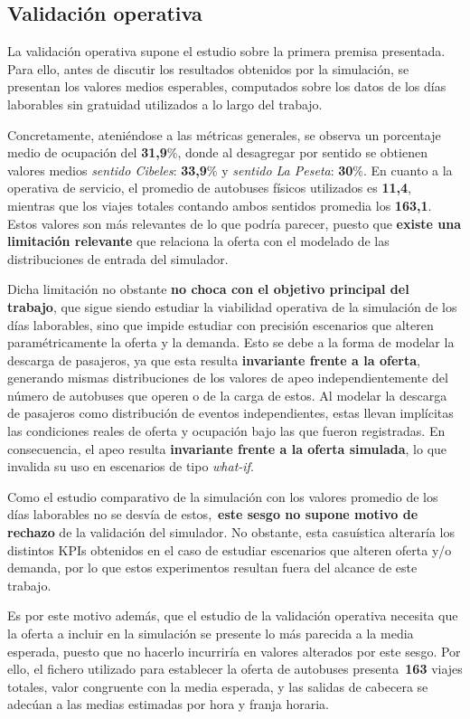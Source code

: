 \subsection{Validación operativa}
La validación operativa supone el estudio sobre la primera premisa presentada. Para ello, antes de discutir los resultados obtenidos
por la simulación, se presentan los valores medios esperables, computados sobre los datos de los días laborables sin gratuidad utilizados
a lo largo del trabajo.

Concretamente, ateniéndose a las métricas generales, se observa un porcentaje medio de ocupación del \textbf{31,9}\%, donde al desagregar
por sentido se obtienen valores medios \textit{sentido Cibeles}: \textbf{33,9}\% y \textit{sentido La Peseta}: \textbf{30}\%.
En cuanto a la operativa de servicio, el promedio de autobuses físicos utilizados es \textbf{11,4}, mientras que los viajes totales contando
ambos sentidos promedia los \textbf{163,1}. Estos valores son más relevantes de lo que podría parecer, puesto que \textbf{existe una limitación 
relevante} que relaciona la oferta con el modelado de las distribuciones de entrada del simulador.

Dicha limitación no obstante \textbf{no choca con el objetivo principal del trabajo}, que sigue siendo estudiar la viabilidad operativa
de la simulación de los días laborables, sino que impide estudiar con precisión escenarios que alteren paramétricamente la oferta y la demanda.
Esto se debe a la forma de modelar la descarga de pasajeros, ya que esta resulta \textbf{invariante frente a la oferta}, generando
mismas distribuciones de los valores de apeo independientemente del número de autobuses que operen o de la carga de estos.
Al modelar la descarga de pasajeros como distribución de eventos independientes, estas llevan implícitas las condiciones reales de oferta y 
ocupación bajo las que fueron registradas. En consecuencia, el apeo resulta \textbf{invariante frente a la oferta simulada},
lo que invalida su uso en escenarios de tipo \textit{what-if}.

Como el estudio comparativo de la simulación
con los valores promedio de los días laborables no se desvía de estos,~\textbf{este sesgo no supone motivo de rechazo} de la 
validación del simulador. No obstante, esta casuística alteraría los distintos KPIs obtenidos en el caso de estudiar escenarios
que alteren oferta y/o demanda, por lo que estos experimentos resultan fuera del alcance de este trabajo.

Es por este motivo además, que el estudio de la validación operativa necesita que la oferta a incluir en la simulación se presente
lo más parecida a la media esperada, puesto que no hacerlo incurriría en valores alterados por este sesgo. Por ello, el fichero
utilizado para establecer la oferta de autobuses presenta~\textbf{163} viajes totales, valor congruente con la media esperada,
y las salidas de cabecera se adecúan a las medias estimadas por hora y franja horaria.

